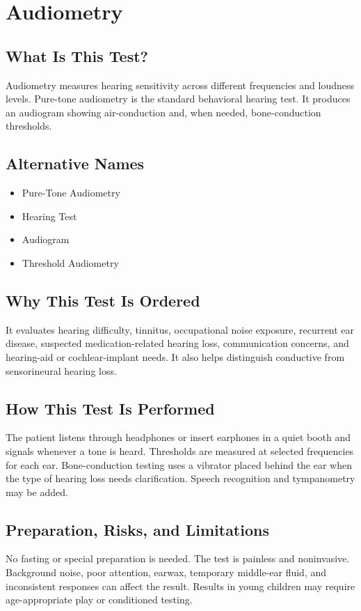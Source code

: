 \chapter{Audiometry}

\section*{What Is This Test?}
Audiometry measures hearing sensitivity across different frequencies and loudness levels. Pure-tone audiometry is the standard behavioral hearing test. It produces an audiogram showing air-conduction and, when needed, bone-conduction thresholds.

\section*{Alternative Names}
\begin{itemize}
  \item Pure-Tone Audiometry
  \item Hearing Test
  \item Audiogram
  \item Threshold Audiometry
\end{itemize}
\section*{Why This Test Is Ordered}
It evaluates hearing difficulty, tinnitus, occupational noise exposure, recurrent ear disease, suspected medication-related hearing loss, communication concerns, and hearing-aid or cochlear-implant needs. It also helps distinguish conductive from sensorineural hearing loss.

\section*{How This Test Is Performed}
The patient listens through headphones or insert earphones in a quiet booth and signals whenever a tone is heard. Thresholds are measured at selected frequencies for each ear. Bone-conduction testing uses a vibrator placed behind the ear when the type of hearing loss needs clarification. Speech recognition and tympanometry may be added.

\section*{Preparation, Risks, and Limitations}
No fasting or special preparation is needed. The test is painless and noninvasive. Background noise, poor attention, earwax, temporary middle-ear fluid, and inconsistent responses can affect the result. Results in young children may require age-appropriate play or conditioned testing.

